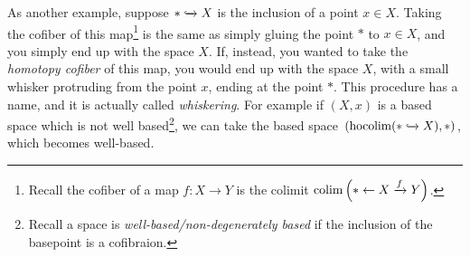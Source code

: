 \begin{example} As another example, suppose $\ast \xhookrightarrow{} X$ is the inclusion of a point $x\in X$. Taking the cofiber of this map\footnote{Recall the cofiber of a map $f: X \to Y$ is the colimit $\mathop{\operatorname*{colim}} \left( \ast \leftarrow X \xrightarrow{f} Y \right)$.} is the same as simply gluing the point $\ast$ to $x\in X$, and you simply end up with the space $X$. If, instead, you wanted to take the \textit{homotopy cofiber} of this map, you would end up with the space $X$, with a small whisker protruding from the point $x$, ending at the point $\ast$. This procedure has a name, and it is actually called \textit{whiskering}. For example if $(X,x)$ is a based space which is not well based\footnote{Recall a space is \textit{well-based/non-degenerately based} if the inclusion of the basepoint is a cofibraion.}, we can take the based space $(\mathop{\operatorname*{hocolim}}(\ast \xhookrightarrow{} X),\ast)$, which becomes well-based.
\end{example}

\begin{figure}[H]
  \centering
\end{figure}



